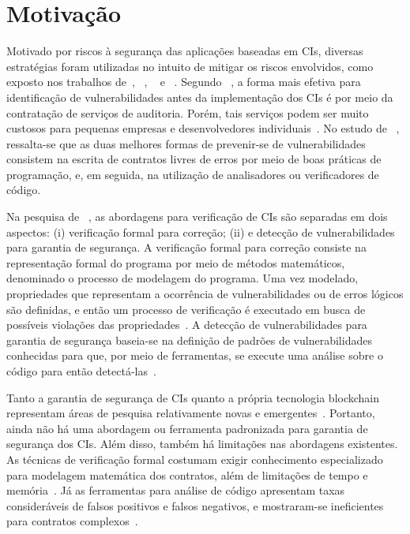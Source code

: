 \section{Motivação}

Motivado por riscos à segurança das aplicações baseadas em CIs, diversas estratégias foram utilizadas no intuito de mitigar os riscos envolvidos, como exposto nos trabalhos de~, ~, ~ e ~. Segundo ~, a forma mais efetiva para identificação de vulnerabilidades antes da implementação dos CIs é por meio da contratação de serviços de auditoria. Porém, tais serviços podem ser muito custosos para pequenas empresas e desenvolvedores individuais~\cite{dika2018security}. No estudo de ~, ressalta-se que as duas melhores formas de prevenir-se de vulnerabilidades consistem na escrita de contratos livres de erros por meio de boas práticas de programação, e, em seguida, na utilização de analisadores ou verificadores de código.  

Na pesquisa de ~, as abordagens para verificação de CIs são separadas em dois aspectos: (i) verificação formal para correção; (ii) e detecção de vulnerabilidades para garantia de segurança. A verificação formal para correção consiste na representação formal do programa por meio de métodos matemáticos, denominado o processo de modelagem do programa. Uma vez modelado, propriedades que representam a ocorrência de vulnerabilidades ou de erros lógicos são definidas, e então um processo de verificação é executado em busca de possíveis violações das propriedades~\cite{almakhour2020verification, singh2020survey-vulnerabilities-elsevier}. A detecção de vulnerabilidades para garantia de segurança baseia-se na definição de padrões de vulnerabilidades conhecidas para que, por meio de ferramentas, se execute uma análise sobre o código para então detectá-las~\cite{almakhour2020verification}.

Tanto a garantia de segurança de CIs quanto a própria tecnologia blockchain representam áreas de pesquisa relativamente novas e emergentes~\cite{chen2020survey-ethereum-acm, kannengiesser2020trade-offs-acmcs}. Portanto, ainda não há uma abordagem ou ferramenta padronizada para garantia de segurança dos CIs. Além disso, também há limitações nas abordagens existentes. As técnicas de verificação formal costumam exigir conhecimento especializado para modelagem matemática dos contratos, além de limitações de tempo e memória~\cite{chen2020survey-ethereum-acm}. Já as ferramentas para análise de código apresentam taxas consideráveis de falsos positivos e falsos negativos, e mostraram-se ineficientes para contratos complexos~\cite{kim2020automated-test-sc}. 

